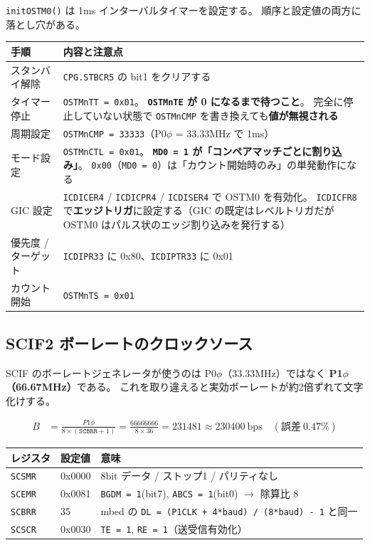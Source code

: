 \documentclass[a4paper,11pt,dvipdfmx]{jsarticle}
\begin{document}
\texttt{initOSTM0()} は 1ms インターバルタイマーを設定する。
順序と設定値の両方に落とし穴がある。

\begin{tabularx}{\textwidth}{l X}
\toprule
\textbf{手順} & \textbf{内容と注意点} \\
\midrule
スタンバイ解除 & \texttt{CPG.STBCR5} の bit1 をクリアする \\
タイマー停止   & \texttt{OSTMnTT = 0x01}。
  \textbf{\texttt{OSTMnTE} が 0 になるまで待つこと}。
  完全に停止していない状態で \texttt{OSTMnCMP} を書き換えても\textbf{値が無視される} \\
周期設定       & \texttt{OSTMnCMP = 33333}（P0$\phi$ = 33.33MHz で 1ms） \\
モード設定     & \texttt{OSTMnCTL = 0x01}。
  \textbf{\texttt{MD0 = 1} が「コンペアマッチごとに割り込み」}。
  \texttt{0x00}（\texttt{MD0 = 0}）は「カウント開始時のみ」の単発動作になる \\
GIC 設定       & \texttt{ICDICER4} / \texttt{ICDICPR4} / \texttt{ICDISER4} で OSTM0 を有効化。
  \texttt{ICDICFR8} で\textbf{エッジトリガ}に設定する（GIC の既定はレベルトリガだが
  OSTM0 はパルス状のエッジ割り込みを発行する） \\
優先度 / ターゲット & \texttt{ICDIPR33} に 0x80、\texttt{ICDIPTR33} に 0x01 \\
カウント開始   & \texttt{OSTMnTS = 0x01} \\
\bottomrule
\end{tabularx}

\subsection{SCIF2 ボーレートのクロックソース}\label{sec:scif}

SCIF のボーレートジェネレータが使うのは P0$\phi$（33.33MHz）ではなく
\textbf{P1$\phi$（66.67MHz）}である。
これを取り違えると実効ボーレートが約2倍ずれて文字化けする。

\begin{align*}
  B &= \frac{P1\phi}{8 \times (\mathtt{SCBRR} + 1)}
     = \frac{66666666}{8 \times 36} = 231481 \approx 230400\ \mathrm{bps} \quad (\text{誤差}\ 0.47\%)
\end{align*}

\begin{tabularx}{\textwidth}{l l X}
\toprule
\textbf{レジスタ} & \textbf{設定値} & \textbf{意味} \\
\midrule
\texttt{SCSMR} & 0x0000 & 8bit データ / ストップ1 / パリティなし \\
\texttt{SCEMR} & 0x0081 & \texttt{BGDM = 1}(bit7), \texttt{ABCS = 1}(bit0) $\rightarrow$ 除算比 8 \\
\texttt{SCBRR} & 35     & mbed の \texttt{DL = (P1CLK + 4*baud) / (8*baud) - 1} と同一 \\
\texttt{SCSCR} & 0x0030 & \texttt{TE = 1}, \texttt{RE = 1}（送受信有効化） \\
\bottomrule
\end{tabularx}
\end{document}
